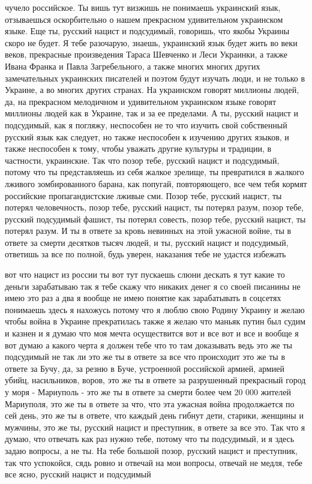 чучело российское. Ты вишь тут визжишь не понимаешь украинский язык,
отзываешься оскорбительно о нашем прекрасном удивительном украинском языке. Еще
ты, русский нацист и подсудимый, говоришь, что якобы Украины скоро не будет. Я
тебе разочарую, знаешь, украинский язык будет жить во веки веков, прекрасные
произведения Тараса Шевченко и Леси Украинки, а также Ивана Франка и Павла
Загребельного, а также многих многих других замечательных украинских писателей
и поэтом будут изучать люди, и не только в Украине, а во многих других странах.
На украинском говорят миллионы людей, да, на прекрасном мелодичном и
удивительном украинском языке говорят миллионы людей как в Украине, так и за ее
пределами. А ты, русский нацист и подсудимый, как я погляжу, неспособен не то
что изучить свой собственный русский язык как следует, но также неспособен к
изучению других языков, и также неспособен к тому, чтобы уважать другие
культуры и традиции, в частности, украинские. Так что позор тебе, русский
нацист и подсудимый, потому что ты представляешь из себя жалкое зрелище, ты
превратился в жалкого лживого зомбированного барана, как попугай, повторяющего,
все чем тебя кормят российские пропагандистские лживые сми. Позор тебе, русский
нацист, ты потерял человечность, позор тебе, русский нацист, ты потерял разум,
позор тебе, русский подсудимый фашист, ты потерял совесть, позор тебе, русский
нацист, ты потерял разум. И ты в ответе за кровь невинных на этой ужасной
войне, ты в ответе за смерти десятков тысяч людей, и ты, русский нацист и
подсудимый, ответишь за все по полной, будь уверен, наказания тебе не удастся
избежать

вот что нацист из россии ты вот тут пускаешь слюни дескать я тут какие то
деньги зарабатываю так я тебе скажу что никаких денег я со своей писанины не
имею это раз а два я вообще не имею понятие как зарабатывать в соцсетях
понимаешь здесь я нахожусь потому что я люблю свою Родину Украину и желаю чтобы
война в Украине прекратилась также я желаю что маньяк путин был судим и казнен
и я думаю что моя мечта осуществится вот и все вот и все и вообще я вот думаю а
какого черта я должен тебе что то там доказывать ведь это же ты подсудимый не
так ли это же ты в ответе за все что происходит это же ты в ответе за Бучу, да,
за резню в Буче, устроенной российской армией, армией убийц, насильников,
воров, это же ты в ответе за разрушенный прекрасный город у моря - Мариуполь -
это же ты в ответе за смерти более чем 20 000 жителей Мариуполя, это же ты в
ответе за что, что эта ужасная война продолжается по сей день, это же ты в
ответе, что каждый день гибнут дети, старики, женщины и мужчины, это же ты,
русский нацист и преступник, в ответе за все это. Так что я думаю, что отвечать
как раз нужно тебе, потому что ты подсудимый, и я здесь задаю вопросы, а не ты.
На тебе большой позор, русский нацист и преступник, так что успокойся, сядь
ровно и отвечай на мои вопросы, отвечай не медля, тебе все ясно, русский нацист
и подсудимый

